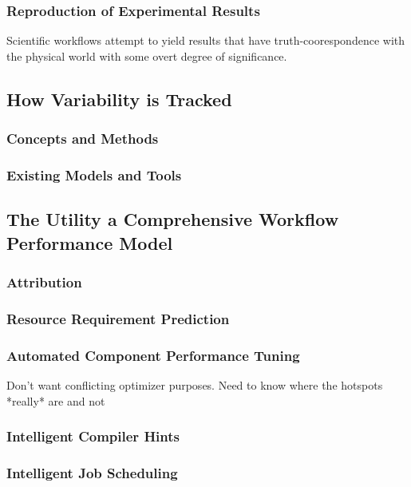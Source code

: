 \documentclass[10pt, conference, compsocconf]{IEEEtran}
\begin{document}
\subsubsection{Reproduction of Experimental Results}
Scientific workflows attempt to yield results that have truth-coorespondence 
with the physical world with some overt degree of significance.

\subsection{How Variability is Tracked}
\subsubsection{Concepts and Methods}
\subsubsection{Existing Models and Tools}

\subsection{The Utility a Comprehensive Workflow Performance Model}
\subsubsection{Attribution}
\subsubsection{Resource Requirement Prediction}
\subsubsection{Automated Component Performance Tuning}
Don't want conflicting optimizer purposes. Need to know where the hotspots 
*really* are and not 
\subsubsection{Intelligent Compiler Hints}
\subsubsection{Intelligent Job Scheduling}
\end{document}
